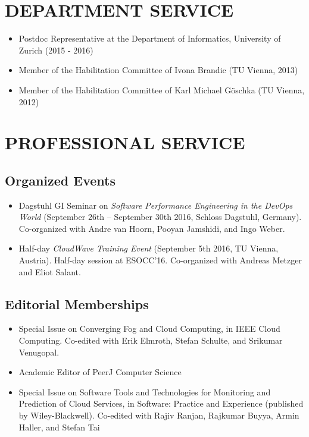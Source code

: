\documentclass[paper=letter,fontsize=11pt]{scrartcl} %
\newcommand{\NewPart}[2]{\section*{\uppercase{#1} #2}}
\begin{document}
\NewPart{Department Service}{}
\begin{itemize}
\item Postdoc Representative at the Department of Informatics, University of Zurich (2015 - 2016)
\item Member of the Habilitation Committee of Ivona Brandic (TU Vienna, 2013)
\item Member of the Habilitation Committee of Karl Michael G\"oschka (TU Vienna, 2012)
\end{itemize}

\NewPart{Professional Service}{}

\subsection*{Organized Events}
\begin{itemize}
\item Dagstuhl GI Seminar on \emph{Software Performance Engineering in the DevOps World} (September 26th – September 30th 2016, Schloss Dagstuhl, Germany). Co-organized with Andre van Hoorn, Pooyan Jamshidi, and Ingo Weber.
\item Half-day \emph{CloudWave Training Event} (September 5th 2016, TU Vienna, Austria). Half-day session at ESOCC'16. Co-organized with Andreas Metzger and Eliot Salant.
\end{itemize}

\subsection*{Editorial Memberships}
\begin{itemize}
\item Special Issue on Converging Fog and Cloud Computing, in IEEE Cloud Computing. Co-edited with Erik Elmroth, Stefan Schulte, and Srikumar Venugopal.
\item Academic Editor of PeerJ Computer Science
\item Special Issue on Software Tools and Technologies for Monitoring and Prediction of Cloud Services, in Software: Practice and Experience (published by Wiley-Blackwell). Co-edited with Rajiv Ranjan, Raj\-kumar Buyya, Armin Haller, and Stefan Tai
\end{itemize}
\end{document}
